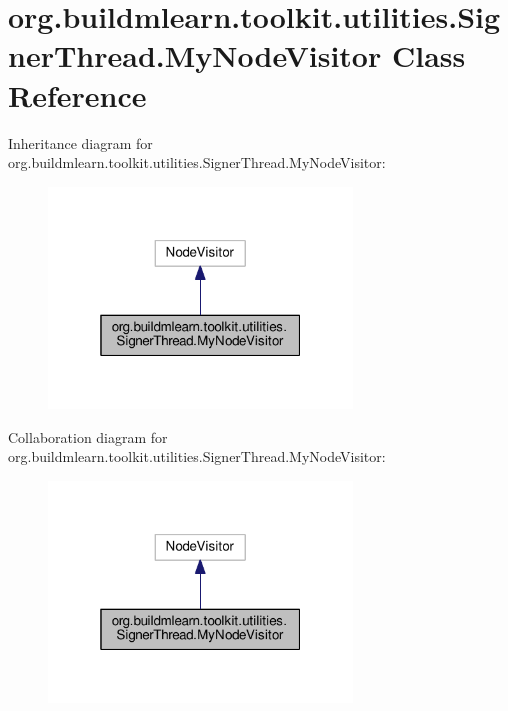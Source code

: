 \hypertarget{classorg_1_1buildmlearn_1_1toolkit_1_1utilities_1_1SignerThread_1_1MyNodeVisitor}{}\section{org.\+buildmlearn.\+toolkit.\+utilities.\+Signer\+Thread.\+My\+Node\+Visitor Class Reference}
\label{classorg_1_1buildmlearn_1_1toolkit_1_1utilities_1_1SignerThread_1_1MyNodeVisitor}


Inheritance diagram for org.\+buildmlearn.\+toolkit.\+utilities.\+Signer\+Thread.\+My\+Node\+Visitor\+:
\nopagebreak
\begin{figure}[H]
\begin{center}
\leavevmode
\includegraphics[width=229pt]{classorg_1_1buildmlearn_1_1toolkit_1_1utilities_1_1SignerThread_1_1MyNodeVisitor__inherit__graph}
\end{center}
\end{figure}


Collaboration diagram for org.\+buildmlearn.\+toolkit.\+utilities.\+Signer\+Thread.\+My\+Node\+Visitor\+:
\nopagebreak
\begin{figure}[H]
\begin{center}
\leavevmode
\includegraphics[width=229pt]{classorg_1_1buildmlearn_1_1toolkit_1_1utilities_1_1SignerThread_1_1MyNodeVisitor__coll__graph}
\end{center}
\end{figure}
